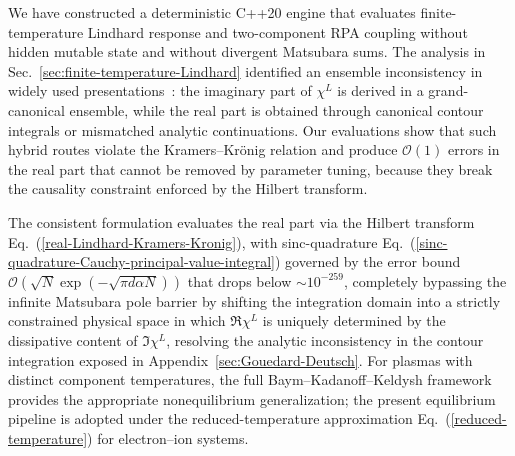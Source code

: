 \documentclass[aps,showkeys,noshowpacs,superscriptaddress,pre,preprint]{revtex4-2}
\begin{document}
We have constructed a deterministic C++20 engine that evaluates finite-temperature Lindhard response
and two-component RPA coupling without hidden mutable state and without divergent Matsubara sums.
The analysis in Sec.~\ref{sec:finite-temperature-Lindhard} identified an ensemble inconsistency
in widely used presentations~\cite{Giuliani-Vignale2005}:
the imaginary part of $\chi^L$ is derived in a grand-canonical ensemble,
while the real part is obtained through canonical contour integrals
or mismatched analytic continuations.
Our evaluations show that such hybrid routes violate the Kramers--Kr\"onig relation
and produce $\mathcal{O}(1)$ errors in the real part that cannot be removed by parameter tuning,
because they break the causality constraint enforced by the Hilbert transform.

The consistent formulation evaluates the real part via the Hilbert transform
Eq.~(\ref{real-Lindhard-Kramers-Kronig}),
with sinc-quadrature Eq.~(\ref{sinc-quadrature-Cauchy-principal-value-integral})
governed by the error bound $\mathcal{O}(\sqrt{N} \exp(-\sqrt{\pi d \alpha N}))$ that drops below $\sim 10^{-259}$, completely bypassing the infinite Matsubara pole barrier by shifting the integration domain into a strictly constrained physical space in which
$\Re\chi^L$ is uniquely determined by the dissipative content of $\Im\chi^L$,
resolving the analytic inconsistency
in the contour integration exposed in Appendix~\ref{sec:Gouedard-Deutsch}.
For plasmas with distinct component temperatures, the full Baym--Kadanoff--Keldysh framework
\cite{Kadanoff1962,Stefanucci2013,Kim2018} provides the appropriate nonequilibrium generalization;
the present equilibrium pipeline is adopted under the reduced-temperature approximation
Eq.~(\ref{reduced-temperature}) for electron--ion systems.
\end{document}
